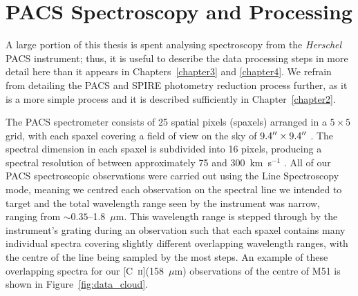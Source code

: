 \section{PACS Spectroscopy and Processing} \label{pac_spec}
A large portion of this thesis is spent analysing spectroscopy from the \emph{Herschel} PACS instrument; thus, it is useful to describe the data processing steps in more detail here than it appears in Chapters~\ref{chapter3} and \ref{chapter4}.  We refrain from detailing the PACS and SPIRE photometry reduction process further, as it is a more simple process and it is described sufficiently in Chapter~\ref{chapter2}.

The PACS spectrometer consists of 25 spatial pixels (spaxels) arranged in a $5 \times 5$ grid, with each spaxel covering a field of view on the sky of $9.4 \mbox{$^{\prime\prime}$} \times 9.4 \mbox{$^{\prime\prime}$}$ \citep{pacs_om}.  The spectral dimension in each spaxel is subdivided into 16 pixels, producing a spectral resolution of between approximately 75 and 300~km~s$^{-1}$ \citep{pacs_om}.  All of our PACS spectroscopic observations were carried out using the Line Spectroscopy mode, meaning we centred each observation on the spectral line we intended to target and the total wavelength range seen by the instrument was narrow, ranging from $\sim 0.35$--1.8~$\mu$m.  This wavelength range is stepped through by the instrument's grating during an observation such that each spaxel contains many individual spectra covering slightly different overlapping wavelength ranges, with the centre of the line being sampled by the most steps.  An example of these overlapping spectra for our [C~\textsc{ii}](158~$\mu$m) observations of the centre of M51 is shown in Figure~\ref{fig:data_cloud}.

